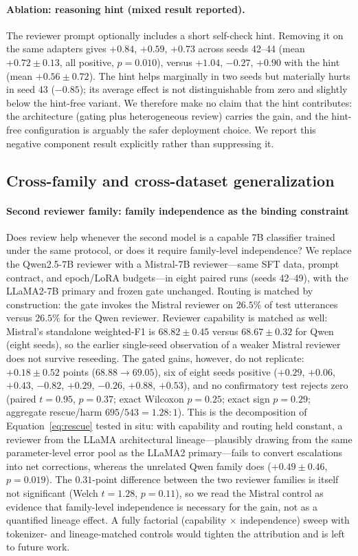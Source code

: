 \documentclass[final,5p,times,twocolumn]{elsarticle}
\begin{document}
\paragraph{Ablation: reasoning hint (mixed result reported).}
The reviewer prompt optionally includes a short self-check hint. Removing it
on the same adapters gives $+0.84$, $+0.59$, $+0.73$ across seeds 42--44
(mean $+0.72 \pm 0.13$, all positive, $p{=}0.010$), versus $+1.04$, $-0.27$,
$+0.90$ with the hint (mean $+0.56 \pm 0.72$). The hint helps marginally in
two seeds but materially hurts in seed 43 ($-0.85$); its average effect is
not distinguishable from zero and slightly below the hint-free variant. We
therefore make no claim that the hint contributes: the architecture
(gating plus heterogeneous review) carries the gain, and the hint-free
configuration is arguably the safer deployment choice. We report this
negative component result explicitly rather than suppressing it.

\subsection{Cross-family and cross-dataset generalization}
\label{sec:generalization}
\paragraph{Second reviewer family: family independence as the binding
constraint}
Does review help whenever the second model is a capable 7B classifier trained
under the same protocol, or does it require family-level independence? We
replace the Qwen2.5-7B reviewer with a Mistral-7B reviewer---same SFT data,
prompt contract, and epoch/LoRA budgets---in eight paired runs (seeds
42--49), with the LLaMA2-7B primary and frozen gate unchanged. Routing is matched by construction: the
gate invokes the Mistral reviewer on $26.5\%$ of test utterances versus
$26.5\%$ for the Qwen reviewer. Reviewer capability is matched as well:
Mistral's standalone weighted-F1 is $68.82 \pm 0.45$ versus $68.67 \pm 0.32$
for Qwen (eight seeds), so the earlier single-seed observation of a weaker
Mistral reviewer does not survive reseeding. The gated gains, however, do
not replicate: $\mathbf{+0.18 \pm 0.52}$ points ($68.88 \to 69.05$), six of
eight seeds positive ($+0.29$, $+0.06$, $+0.43$, $-0.82$, $+0.29$, $-0.26$,
$+0.88$, $+0.53$), and no confirmatory test rejects zero (paired $t{=}0.95$,
$p{=}0.37$; exact Wilcoxon $p{=}0.25$; exact sign $p{=}0.29$; aggregate
rescue/harm $695/543 = 1.28{:}1$). This is the decomposition of
Equation~\eqref{eq:rescue} tested in situ: with capability and routing held
constant, a reviewer from the LLaMA architectural lineage---plausibly
drawing from the same parameter-level error pool as the LLaMA2 primary---fails
to convert escalations into net corrections, whereas the unrelated Qwen
family does ($+0.49 \pm 0.46$, $p{=}0.019$). The $0.31$-point difference
between the two reviewer families is itself not significant (Welch
$t{=}1.28$, $p{=}0.11$), so we read the Mistral control as evidence that
family-level independence is necessary for the gain, not as a quantified
lineage effect. A fully factorial (capability $\times$ independence) sweep
with tokenizer- and lineage-matched controls would tighten the attribution
and is left to future work.
\end{document}
